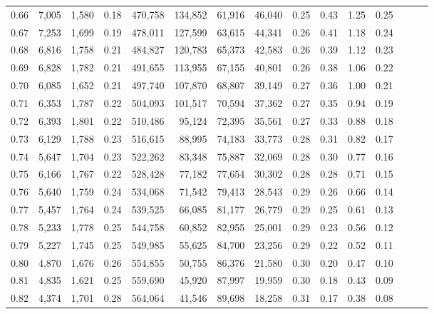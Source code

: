 \begin{tabular}{rrrrrrrrrrrrrrr}
0.66 &   7,005 &  1,580 &  0.18 &  470,758 &  134,852 &   61,916 &   46,040 &  0.25 &  0.43 &  1.25 &      0.25 \\
0.67 &   7,253 &  1,699 &  0.19 &  478,011 &  127,599 &   63,615 &   44,341 &  0.26 &  0.41 &  1.18 &      0.24 \\
0.68 &   6,816 &  1,758 &  0.21 &  484,827 &  120,783 &   65,373 &   42,583 &  0.26 &  0.39 &  1.12 &      0.23 \\
0.69 &   6,828 &  1,782 &  0.21 &  491,655 &  113,955 &   67,155 &   40,801 &  0.26 &  0.38 &  1.06 &      0.22 \\
0.70 &   6,085 &  1,652 &  0.21 &  497,740 &  107,870 &   68,807 &   39,149 &  0.27 &  0.36 &  1.00 &      0.21 \\
0.71 &   6,353 &  1,787 &  0.22 &  504,093 &  101,517 &   70,594 &   37,362 &  0.27 &  0.35 &  0.94 &      0.19 \\
0.72 &   6,393 &  1,801 &  0.22 &  510,486 &   95,124 &   72,395 &   35,561 &  0.27 &  0.33 &  0.88 &      0.18 \\
0.73 &   6,129 &  1,788 &  0.23 &  516,615 &   88,995 &   74,183 &   33,773 &  0.28 &  0.31 &  0.82 &      0.17 \\
0.74 &   5,647 &  1,704 &  0.23 &  522,262 &   83,348 &   75,887 &   32,069 &  0.28 &  0.30 &  0.77 &      0.16 \\
0.75 &   6,166 &  1,767 &  0.22 &  528,428 &   77,182 &   77,654 &   30,302 &  0.28 &  0.28 &  0.71 &      0.15 \\
0.76 &   5,640 &  1,759 &  0.24 &  534,068 &   71,542 &   79,413 &   28,543 &  0.29 &  0.26 &  0.66 &      0.14 \\
0.77 &   5,457 &  1,764 &  0.24 &  539,525 &   66,085 &   81,177 &   26,779 &  0.29 &  0.25 &  0.61 &      0.13 \\
0.78 &   5,233 &  1,778 &  0.25 &  544,758 &   60,852 &   82,955 &   25,001 &  0.29 &  0.23 &  0.56 &      0.12 \\
0.79 &   5,227 &  1,745 &  0.25 &  549,985 &   55,625 &   84,700 &   23,256 &  0.29 &  0.22 &  0.52 &      0.11 \\
0.80 &   4,870 &  1,676 &  0.26 &  554,855 &   50,755 &   86,376 &   21,580 &  0.30 &  0.20 &  0.47 &      0.10 \\
0.81 &   4,835 &  1,621 &  0.25 &  559,690 &   45,920 &   87,997 &   19,959 &  0.30 &  0.18 &  0.43 &      0.09 \\
0.82 &   4,374 &  1,701 &  0.28 &  564,064 &   41,546 &   89,698 &   18,258 &  0.31 &  0.17 &  0.38 &      0.08 \\

\end{tabular}
